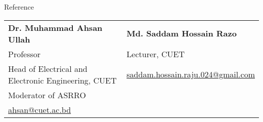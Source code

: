 \documentclass{article}
\newlength{\tabin}
\newlength{\secsep}
\newcommand{\lineunder}{\vspace*{-8pt} \\ \hspace*{-6pt} \hrulefill \\ \vspace*{-15pt}}
\newenvironment{tabbedsection}[1]{
  \begin{list}{}{
      \setlength{\itemsep}{0pt}
      \setlength{\labelsep}{0pt}
      \setlength{\labelwidth}{0pt}
      \setlength{\leftmargin}{\tabin}
      \setlength{\rightmargin}{\tabin}
      \setlength{\listparindent}{0pt}
      \setlength{\parsep}{0pt}
      \setlength{\parskip}{0pt}
      \setlength{\partopsep}{0pt}
      \setlength{\topsep}{#1}
    }
  \item[]
}{\end{list}}
\newenvironment{resume_section}[1]{
  \filbreak
  \vspace{2\secsep}
  \textsc{\large#1}
  \lineunder
  \begin{tabbedsection}{\secsep}
}{\end{tabbedsection}}
\begin{document}



\begin{resume_section}{Reference}
  \vspace{5px}
  \begin{tabularx}{\textwidth}{XX}
    \textbf{Dr. Muhammad Ahsan Ullah} & \textbf{Md. Saddam Hossain Razo} \\ 
    Professor & Lecturer, CUET \\
    Head of Electrical and Electronic Engineering, CUET & \href{mailto:saddam.hossain.raju.024@gmail.com}{saddam.hossain.raju.024@gmail.com} \\
    Moderator of ASRRO &  \\
    \href{mailto:ahsan@cuet.ac.bd}{ahsan@cuet.ac.bd} &
  
  \end{tabularx}
\end{resume_section}
\end{document}
